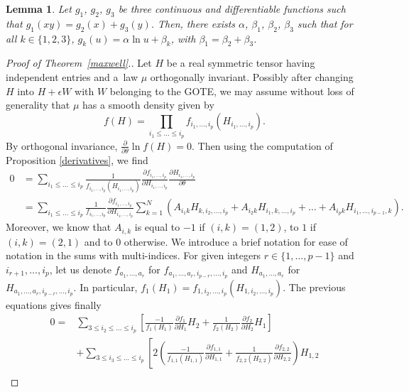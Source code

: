 \documentclass[pdftex]{sigma}
\numberwithin{equation}{section}
\newtheorem{Lemma}[Theorem]{Lemma}
\theoremstyle{definition}
\begin{document}
\begin{Lemma}\label{xy}
Let $g_1$, $g_2$, $g_3$ be three continuous and differentiable functions such that
$ g_1(xy)=g_2(x)+g_3(y)$.
Then, there exists $\alpha$, $\beta_1$, $\beta_2$, $\beta_3$ such that for all $k\in \{1,2,3\}$,
$g_k(u)=\alpha \ln u + \beta_k$,
with $\beta_1 = \beta_2+\beta_3$.
\end{Lemma}

\begin{proof}[Proof of Theorem~\ref{maxwell}.]
Let $H$ be a real symmetric tensor having independent entries and a~law $\mu$ orthogonally invariant. Possibly after changing $H$ into $H+\epsilon W$ with $W$ belonging to the GOTE, we may assume without loss of generality that $\mu$ has a smooth density given by
\[ f(H)=\prod_{i_1\leq \dots \leq i_p} f_{i_1,\dots,i_p}(H_{i_1,\dots,i_p}). \]
By orthogonal invariance,
$\frac{\partial}{\partial \theta} \ln f(H)=0$.
Then using the computation of Proposition \ref{derivatives}, we find
\begin{align*}
    0 &= \sum_{i_1\leq \dots \leq i_p} \frac{1}{f_{i_1,\dots,i_p}(H_{i_1,\dots,i_p})} \frac{\partial f_{i_1,\dots,i_p}}{\partial H_{i_1,\dots,i_p}} \frac{\partial H_{i_1,\dots,i_p}}{\partial \theta} \\
    &= \sum_{i_1\leq \dots \leq i_p} \frac{1}{f_{i_1,\dots,i_p}} \frac{\partial f_{i_1,\dots,i_p}}{\partial H_{i_1,\dots,i_p}} \sum_{k=1}^N (A_{i_1k}H_{k,i_2,\dots,i_p} + A_{i_2k}H_{i_1,k,\dots,i_p} + \dots + A_{i_pk}H_{i_1,\dots,i_{p-1},k}).
\end{align*}
Moreover, we know that $A_{i,k}$ is equal to $-1$ if $(i,k)=(1,2)$, to $1$ if $(i,k)=(2,1)$ and to $0$ otherwise. We introduce a brief notation for ease of notation in the sums with multi-indices. For given integers $r \in \{1,\dots, p-1\}$ and $i_{r+1},\dots,i_p$, let us denote $f_{a_1,\dots,a_r}$ for $f_{a_1,\dots,a_r,i_{p-r},\dots,i_p}$ and $H_{a_1,\dots,a_r}$ for $H_{a_1,\dots,a_r,i_{p-r},\dots,i_p}$. In particular, $f_1(H_1)=f_{1,i_{2},\dots,i_p}(H_{1,i_{2},\dots,i_p})$. The previous equations gives finally
\begin{align}
    0= {}&\sum_{3\leq i_2\leq \dots \leq i_p} \left[ \frac{-1}{f_1(H_1)} \frac{\partial f_{1}}{\partial H_{1}} H_2 + \frac{1}{f_2(H_2)} \frac{\partial f_{2}}{\partial H_{2}} H_1 \right]\nonumber\\
    &+ \sum_{3\leq i_3\leq \dots \leq i_p} \left[ 2 \left( \frac{-1}{f_{1,1}(H_{1,1})} \frac{\partial f_{1,1}}{\partial H_{1,1}} + \frac{1}{f_{2,2}(H_{2,2})} \frac{\partial f_{2,2}}{\partial H_{2,2}} \right) H_{1,2}\right.\nonumber\\

\end{align}
\end{proof}
\end{document}
